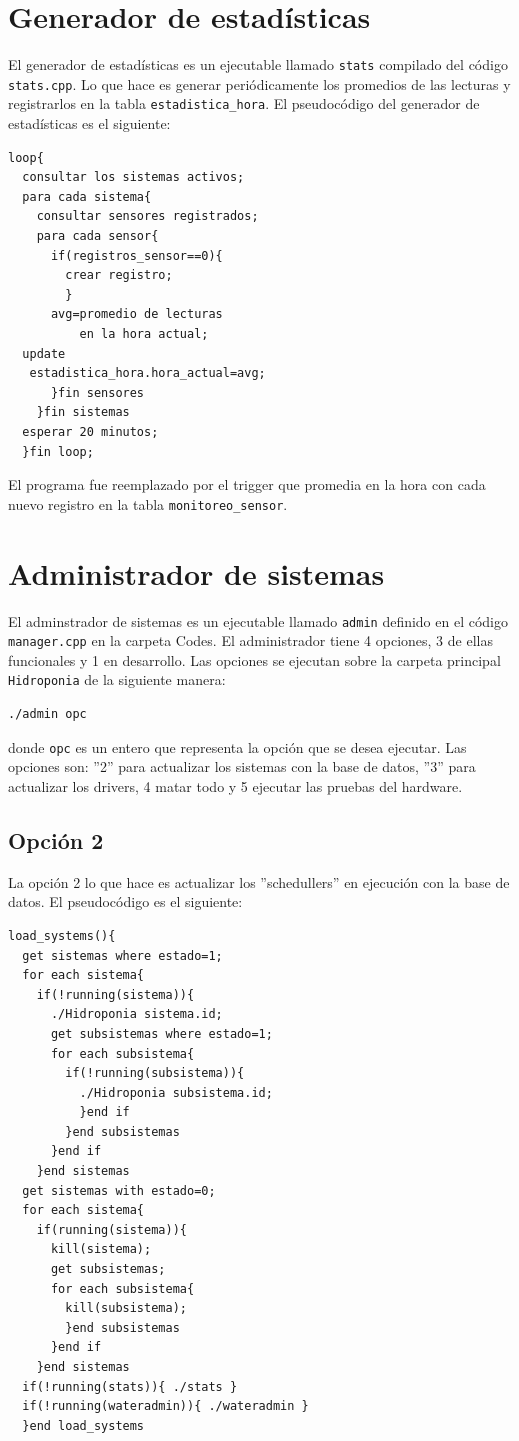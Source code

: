 \documentclass[10pt,twocolumn]{article}
\begin{document}
\section{Generador de estad\'isticas}
El generador de estad\'isticas es un ejecutable llamado \verb|stats| compilado del c\'odigo \verb|stats.cpp|. Lo que hace es generar peri\'odicamente los 
promedios de las lecturas y registrarlos en la tabla \verb|estadistica_hora|. El pseudoc\'odigo del 
generador de estad\'isticas es el siguiente:
\begin{verbatim}
loop{
  consultar los sistemas activos;
  para cada sistema{
    consultar sensores registrados;
    para cada sensor{
      if(registros_sensor==0){
        crear registro;
        }
      avg=promedio de lecturas 
          en la hora actual;
  update 
   estadistica_hora.hora_actual=avg;
      }fin sensores
    }fin sistemas
  esperar 20 minutos;
  }fin loop;
\end{verbatim}

El programa fue reemplazado por el trigger que promedia en la hora con cada nuevo registro en la tabla \verb|monitoreo_sensor|.

\section{Administrador de sistemas}
El adminstrador de sistemas es un ejecutable llamado \verb|admin| definido en el c\'odigo \verb|manager.cpp| en la carpeta Codes. El administrador tiene 4 opciones, 3 de 
ellas funcionales y 1 en desarrollo. Las opciones se ejecutan sobre la carpeta principal \verb|Hidroponia| de la siguiente manera:

\begin{verbatim}
./admin opc
\end{verbatim}

donde \verb|opc| es un entero que representa la opci\'on que se desea ejecutar. Las opciones son: ''2'' para actualizar los sistemas con la base de datos, ''3'' para 
actualizar 
los 
drivers, 4 matar todo y 5 ejecutar las pruebas del hardware.

\subsection{Opci\'on 2}
La opci\'on 2 lo que hace es actualizar los ''schedullers'' en ejecuci\'on con la base de datos. El pseudoc\'odigo es el siguiente:

\begin{verbatim}
load_systems(){
  get sistemas where estado=1;
  for each sistema{
    if(!running(sistema)){
      ./Hidroponia sistema.id;
      get subsistemas where estado=1;
      for each subsistema{
        if(!running(subsistema)){
          ./Hidroponia subsistema.id;
          }end if
        }end subsistemas
      }end if
    }end sistemas
  get sistemas with estado=0;
  for each sistema{
    if(running(sistema)){
      kill(sistema);
      get subsistemas;
      for each subsistema{
        kill(subsistema);
        }end subsistemas
      }end if
    }end sistemas
  if(!running(stats)){ ./stats }
  if(!running(wateradmin)){ ./wateradmin }
  }end load_systems
\end{verbatim}
\end{document}
